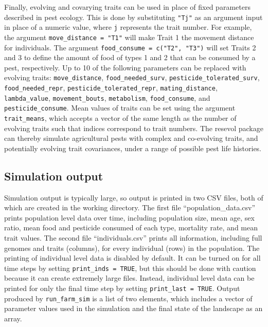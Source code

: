 \documentclass[10pt,letterpaper]{article}
\begin{document}
Finally, evolving and covarying traits can be used in place of fixed parameters described in pest ecology.
This is done by substituting \texttt{"Tj"} as an argument input in place of a numeric value, where \texttt{j} represents the trait number.
For example, the argument \texttt{move\_distance\ =\ "T1"} will make Trait 1 the movement distance for individuals.
The argument \texttt{food\_consume\ =\ c("T2",\ "T3")} will set Traits 2 and 3 to define the amount of food of types 1 and 2 that can be consumed by a pest, respectively.
Up to 10 of the following parameters can be replaced with evolving traits: \texttt{move\_distance}, \texttt{food\_needed\_surv}, \texttt{pesticide\_tolerated\_surv}, \texttt{food\_needed\_repr}, \texttt{pesticide\_tolerated\_repr}, \texttt{mating\_distance}, \texttt{lambda\_value}, \texttt{movement\_bouts}, \texttt{metabolism}, \texttt{food\_consume}, and \texttt{pesticide\_consume}.
Mean values of traits can be set using the argument \texttt{trait\_means}, which accepts a vector of the same length as the number of evolving traits such that indices correspond to trait numbers.
The resevol package can thereby simulate agricultural pests with complex and co-evolving traits, and potentially evolving trait covariances, under a range of possible pest life histories.


\hypertarget{output}{%
\subsection{Simulation output}\label{output}}

Simulation output is typically large, so output is printed in two CSV files, both of which are created in the working directory.
The first file ``population\_data.csv'' prints population level data over time, including population size, mean age, sex ratio, mean food and pesticide consumed of each type, mortality rate, and mean trait values.
The second file ``individuals.csv'' prints all information, including full genomes and traits (columns), for every individual (rows) in the population.
The printing of individual level data is disabled by default.
It can be turned on for all time steps by setting \texttt{print\_inds\ =\ TRUE}, but this should be done with caution because it can create extremely large files.
Instead, individual level data can be printed for only the final time step by setting \texttt{print\_last\ =\ TRUE}.
Output produced by \texttt{run\_farm\_sim} is a list of two elements, which includes a vector of parameter values used in the simulation and the final state of the landscape as an array.
\end{document}
